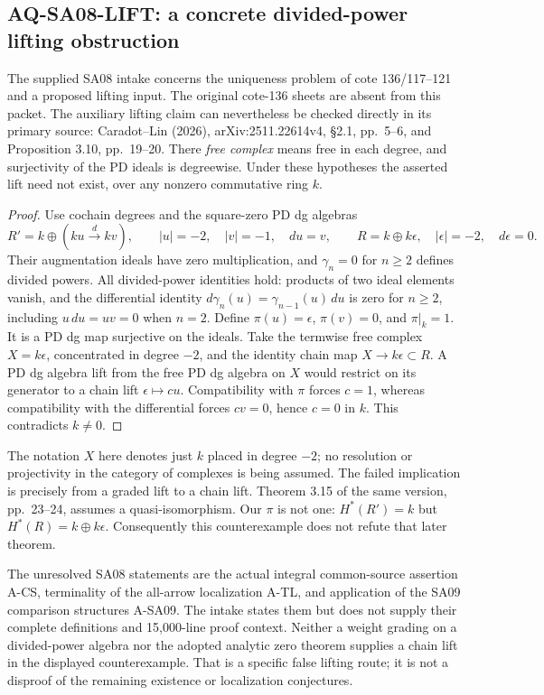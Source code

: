 \documentclass[11pt,a4paper]{article}
\theoremstyle{definition}\newtheorem{definition}[theorem]{Definition}
\theoremstyle{remark}\newtheorem{remark}[theorem]{Remark}
\begin{document}
\subsection{AQ-SA08-LIFT: a concrete divided-power lifting obstruction}
The supplied SA08 intake concerns the uniqueness problem
of cote 136/117--121 and a proposed lifting input.
The original cote-136 sheets are absent from this packet.
The auxiliary lifting claim can nevertheless be checked
directly in its primary source: Caradot--Lin (2026),
arXiv:2511.22614v4, \S2.1, pp.~5--6, and
Proposition 3.10, pp.~19--20.
There \emph{free complex} means free in each degree,
and surjectivity of the PD ideals is degreewise.
Under these hypotheses the asserted lift need not exist,
over any nonzero commutative ring $k$.
\begin{proof}
Use cochain degrees and the square-zero PD dg algebras
\[
 R'=k\oplus(ku\xrightarrow{\,d\,}kv),\qquad
 |u|=-2,\quad |v|=-1,\quad du=v,
 \qquad R=k\oplus k\epsilon,\quad|\epsilon|=-2,\quad d\epsilon=0.
\]
Their augmentation ideals have zero multiplication,
and $\gamma_n=0$ for $n\geq2$ defines divided powers.
All divided-power identities hold: products of two
ideal elements vanish, and the differential identity
$d\gamma_n(u)=\gamma_{n-1}(u)\,du$ is zero for $n\geq2$,
including $u\,du=uv=0$ when $n=2$.
Define $\pi(u)=\epsilon$, $\pi(v)=0$, and $\pi|_k=1$.
It is a PD dg map surjective on the ideals.
Take the termwise free complex $X=k\epsilon$,
concentrated in degree $-2$, and the identity chain
map $X\to k\epsilon\subset R$.
A PD dg algebra lift from the free PD dg algebra
on $X$ would restrict on its generator to a chain
lift $\epsilon\mapsto cu$.
Compatibility with $\pi$ forces $c=1$, whereas
compatibility with the differential forces $cv=0$,
hence $c=0$ in $k$. This contradicts $k\ne0$.
\end{proof}
The notation $X$ here denotes just $k$ placed in
degree $-2$; no resolution or projectivity in the
category of complexes is being assumed.
The failed implication is precisely from a graded
lift to a chain lift. Theorem 3.15 of the same
version, pp.~23--24, assumes a quasi-isomorphism.
Our $\pi$ is not one:
$H^*(R')=k$ but $H^*(R)=k\oplus k\epsilon$.
Consequently this counterexample does not refute
that later theorem.

The unresolved SA08 statements are the actual
integral common-source assertion A-CS, terminality
of the all-arrow localization A-TL, and application
of the SA09 comparison structures A-SA09.
The intake states them but does not supply their
complete definitions and 15,000-line proof context.
Neither a weight grading on a divided-power algebra
nor the adopted analytic zero theorem supplies a
chain lift in the displayed counterexample.
That is a specific false lifting route; it is not
a disproof of the remaining existence or
localization conjectures.
\end{document}
